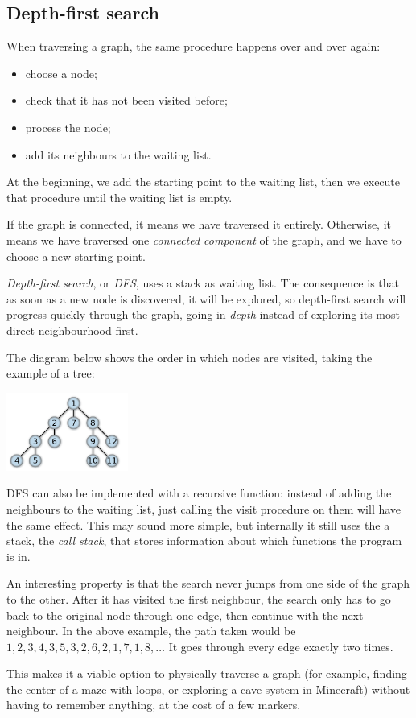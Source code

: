 \subsection{Depth-first search}

When traversing a graph, the same procedure happens over and over again:
\begin{itemize}
    \item choose a node;
    \item check that it has not been visited before;
    \item process the node;
    \item add its neighbours to the waiting list.
\end{itemize}

At the beginning, we add the starting point to the waiting list,
then we execute that procedure until the waiting list is empty.

If the graph is connected, it means we have traversed it entirely.
Otherwise, it means we have traversed one \emph{connected component}
of the graph, and we have to choose a new starting point.

\emph{Depth-first search}, or \emph{DFS}, uses a stack as waiting list.
The consequence is that as soon as a new node is discovered, it will be
explored, so depth-first search will progress quickly through the graph,
going in \emph{depth}
instead of exploring its most direct neighbourhood first.

The diagram below shows the order in which nodes are visited,
taking the example of a tree:
\begin{center}
    \includegraphics[width=0.3\textwidth]{img/dfs}
\end{center}

DFS can also be implemented with a recursive function:
instead of adding the neighbours to the waiting list, just calling the
visit procedure on them will have the same effect.
This may sound more simple, but internally it still uses the a stack,
the \emph{call stack}, that stores information about which functions
the program is in.

An interesting property is that the search never jumps from one side of the
graph to the other. After it has visited the first neighbour, the search only
has to go back to the original node through one edge,
then continue with the next neighbour.
In the above example, the path taken would be
$1,2,3,4,3,5,3,2,6,2,1,7,1,8,\ldots$
It goes through every edge exactly two times.

This makes it a viable option to physically traverse a graph (for example,
finding the center of a maze with loops, or exploring a cave system in
Minecraft) without having to remember anything, at the cost of a few markers.
